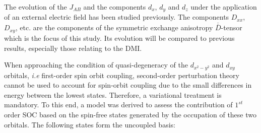 \documentclass[10pt]{report}
\numberwithin{equation}{section}
\begin{document}
\begin{center}
\end{center}
The evolution of the $J_{AB}$ and the components $d_x$, $d_y$ and $d_z$ under the application of an external electric field has been studied previously.
The components $D_{xx}$, $D_{xy}$, etc. are the components of the symmetric exchange anisotropy $\overline{\overline{D}}$-tensor which is the focus of this study.
Its evolution will be compared to previous results, especially those relating to the DMI.

When approaching the condition of quasi-degeneracy of the $d_{x^2-y^2}$ and $d_{xy}$ orbitals, \textit{i.e} first-order spin orbit coupling, second-order perturbation theory cannot be used to account for spin-orbit coupling due to the small differences in energy between the lowest states.
Therefore, a variational treatment is mandatory.
To this end, a model was derived to assess the contribution of $1^{st}$ order SOC based on the spin-free states generated by the occupation of these two orbitals.
The following states form the uncoupled basis:
\end{document}
